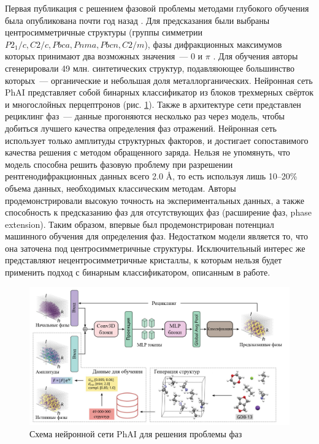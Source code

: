 Первая публикация с решением фазовой проблемы методами глубокого обучения была опубликована почти год назад \cite{larsen_phai_2024}. Для предсказания были выбраны центросимметричные структуры (группы симметрии $P2_1/c, C2/c, Pbca, Pnma, Pbcn, C2/m$), фазы дифракционных максимумов которых принимают два возможных значения~--- 0 и $\pi$ \cite{cowtan_phase_2003}. Для обучения авторы сгенерировали 49 млн. синтетических структур, подавляюющее большинство которых~--- органические и небольшая доля металлорганических. Нейронная сеть PhAI представляет собой бинарных классификатор из блоков трехмерных свёрток и многослойных перцептронов (рис. \ref{phai}). Также в архитектуре сети представлен рециклинг фаз~--- данные прогоняются несколько раз через модель, чтобы добиться лучшего качества определения фаз отражений. Нейронная сеть использует только амплитуды структурных факторов, и достигает сопоставимого качества решения с методом обращенного заряда. Нельзя не упомянуть, что модель способна решить фазовую проблему при разрешении рентгенодифракционных данных всего 2.0 \AA, то есть используя лишь 10--20\% объема данных, необходимых классическим методам. Авторы продемонстрировали высокую точность на экспериментальных данных, а также способность к предсказанию фаз для отсутствующих фаз (расширение фаз, phase extension). Таким образом, впервые был продемонстрирован потенциал машинного обучения для определения фаз. Недостатком модели является то, что она заточена под центросимметричные структуры. Исключительный интерес же представляют нецентросимметричные кристаллы, к которым нельзя будет применить подход с бинарным классификатором, описанным в работе.

\begin{figure}[H]
	\centering
	\includegraphics[width=1\textwidth]{figures/phai.png}\hfill
	\caption{Схема нейронной сети PhAI для решения проблемы фаз \cite{larsen_phai_2024}}
	\label{phai}
\end{figure}

